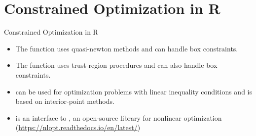 


\section{Constrained Optimization in R}

\begin{vbframe}{Constrained Optimization in R}
\begin{itemize}
\item The function  uses quasi-newton methods and can handle box constraints.
\item The function  uses trust-region procedures and can also handle box constraints.
\item {} can be used for optimization problems with linear inequality conditions and is based on interior-point methods.
\item {} is an interface to , an open-source library for nonlinear optimization (\url{https://nlopt.readthedocs.io/en/latest/})
\end{itemize}

\end{vbframe}












